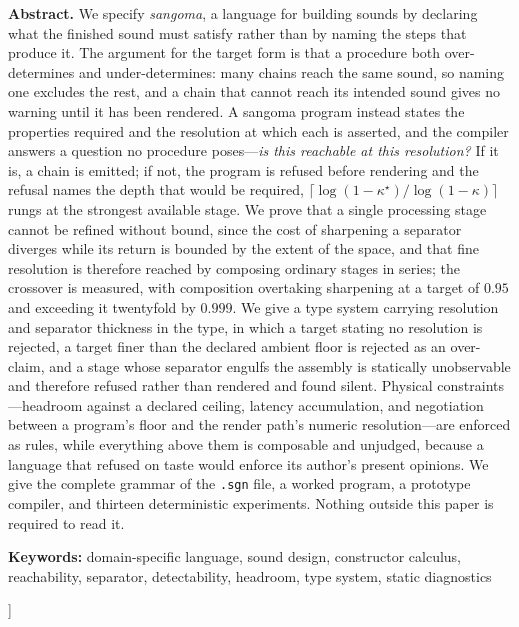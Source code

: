 \documentclass[11pt,twocolumn,a4paper]{article}
\theoremstyle{definition}
\theoremstyle{remark}
\newcommand{\pot}{\kappa}
\begin{document}
\begin{@twocolumnfalse}
\begin{center}
\begin{minipage}{0.92\textwidth}
\textbf{Abstract.}
We specify \emph{sangoma}, a language for building sounds by declaring what the
finished sound must satisfy rather than by naming the steps that produce it. The
argument for the target form is that a procedure both over-determines and
under-determines: many chains reach the same sound, so naming one excludes the
rest, and a chain that cannot reach its intended sound gives no warning until it
has been rendered. A sangoma program instead states the properties required and
the resolution at which each is asserted, and the compiler answers a question no
procedure poses---\emph{is this reachable at this resolution?} If it is, a chain
is emitted; if not, the program is refused before rendering and the refusal names
the depth that would be required, $\lceil\log(1-\pot^{\star})/\log(1-\pot)\rceil$
rungs at the strongest available stage. We prove that a single processing stage
cannot be refined without bound, since the cost of sharpening a separator
diverges while its return is bounded by the extent of the space, and that fine
resolution is therefore reached by composing ordinary stages in series; the
crossover is measured, with composition overtaking sharpening at a target of
$0.95$ and exceeding it twentyfold by $0.999$. We give a type system carrying
resolution and separator thickness in the type, in which a target stating no
resolution is rejected, a target finer than the declared ambient floor is
rejected as an over-claim, and a stage whose separator engulfs the assembly is
statically unobservable and therefore refused rather than rendered and found
silent. Physical constraints---headroom against a declared ceiling, latency
accumulation, and negotiation between a program's floor and the render path's
numeric resolution---are enforced as rules, while everything above them is
composable and unjudged, because a language that refused on taste would enforce
its author's present opinions. We give the complete grammar of the \texttt{.sgn}
file, a worked program, a prototype compiler, and thirteen deterministic
experiments. Nothing outside this paper is required to read it.
\end{minipage}

\vspace{8pt}
\noindent\textbf{Keywords:}
domain-specific language, sound design, constructor calculus, reachability,
separator, detectability, headroom, type system, static diagnostics

\vspace{18pt}
\end{center}
\end{@twocolumnfalse}
]
\end{document}
